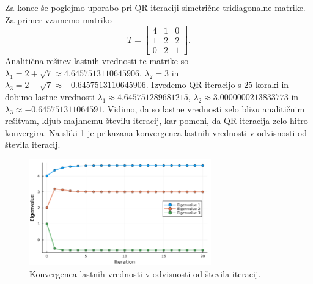 \documentclass[11pt, titlepage]{article}
\begin{document}
Za konec še poglejmo uporabo pri QR iteraciji simetrične tridiagonalne matrike. Za primer vzamemo matriko
$$
T = \begin{bmatrix}
    4 & 1 & 0 \\
    1 & 2 & 2 \\
    0 & 2 & 1
\end{bmatrix}.
$$
Analitična rešitev lastnih vrednosti te matrike so $\lambda_1 = 2 + \sqrt{7} \approx 4.6457513110645906$, $\lambda_2 = 3$ in $\lambda_3 = 2 - \sqrt{7} \approx -0.6457513110645906$.
Izvedemo QR iteracijo s $25$ koraki in dobimo lastne vrednosti $\lambda_1 \approx 4.645751289681215$, $\lambda_2 \approx 3.0000000213833773$ in $\lambda_3 \approx -0.645751311064591$.
Vidimo, da so lastne vrednosti zelo blizu analitičnim rešitvam, kljub majhnemu številu iteracij, kar pomeni, da QR iteracija zelo hitro konvergira. Na sliki \ref{fig:qr_iteration} je prikazana konvergenca lastnih vrednosti v odvisnosti od števila iteracij.
\begin{figure}[ht]
    \centering
    \includegraphics[width=0.7\textwidth]{figures/qr_iteration_convergence.png}
    \caption{Konvergenca lastnih vrednosti v odvisnosti od števila iteracij.}
    \label{fig:qr_iteration}
\end{figure}
\end{document}
